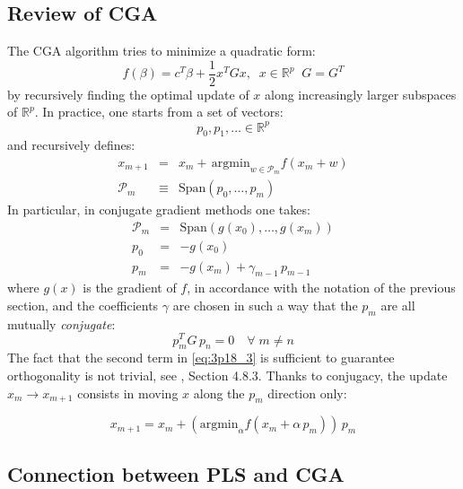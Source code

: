 \subsection*{Review of CGA}

The CGA algorithm tries to minimize a quadratic form:
\begin{equation*}
f(\beta) = c^T \beta + \frac{1}{2} x^T G x, \;\;x \in \mathbb{R}^p\;\; G = G^T
\end{equation*}
by recursively finding the optimal update of $x$ along
increasingly larger subspaces of $\mathbb{R}^p$. In practice,
one starts from a set of vectors:
$$
p_0, p_1, \ldots \in \mathbb{R}^p
$$
and recursively defines:
\begin{eqnarray*}
    x_{m + 1} & = & x_{m} + \,
    \textrm{argmin}_{w \in \mathcal{P}_{m}} f(x_{m} + w) \\
    \mathcal{P}_{m} & \equiv & \textrm{Span} \left(p_0, \ldots, p_m\right)    
\end{eqnarray*}
In particular, in conjugate gradient methods one takes:
\begin{eqnarray}
    \mathcal{P}_{m} & = & \textrm{Span} \left(g(x_0), \ldots, g(x_m)\right) \\
    p_0 & = & - g(x_0) \\ \label{eq:3p18_3}
    p_m & = & - g(x_m) + \gamma_{m - 1}\, p_{m - 1}
\end{eqnarray}
where $g(x)$ is the gradient of $f$, in accordance with
the notation of the previous section, and the coefficients $\gamma$ are chosen
in such a way that the $p_m$ are all mutually \textit{conjugate}:
\begin{equation*}
p_m^T G\,p_n = 0 \quad \forall \; m \neq n
\end{equation*}
The fact that the second term in \eqref{eq:3p18_3} is 
sufficient to guarantee orthogonality is not trivial,
see \cite{Murray1982}, Section 4.8.3. Thanks to conjugacy,
the update $x_m \rightarrow x_{m + 1}$ consists in moving $x$
along the $p_m$ direction only:

\begin{equation}\label{eq:e3p18_update}
x_{m + 1} = x_m + \left(\textrm{argmin}_\alpha 
    f(x_m + \alpha \, p_{m})\right)\, p_m
\end{equation}

\subsection*{Connection between PLS and CGA}

